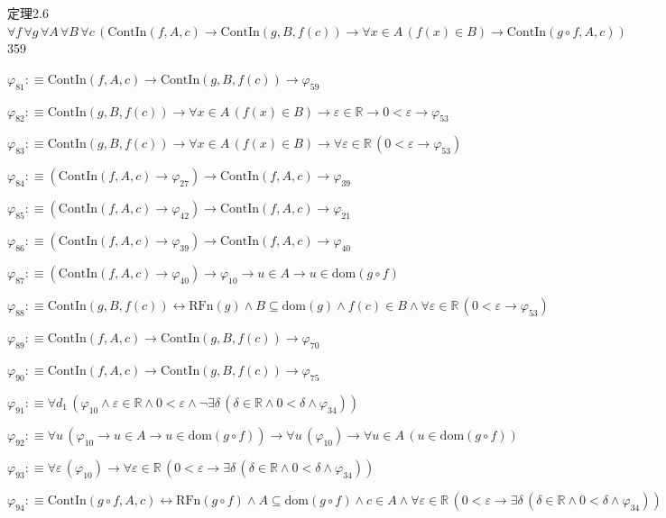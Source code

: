 \begin{fullproof}{定理2.6}{$\forall f\,\forall g\,\forall A\,\forall B\,\forall c\,(\mathrm{ContIn}(f,A,c) \to \mathrm{ContIn}(g,B,f(c)) \to \forall x \in A\,(f(x) \in B) \to \mathrm{ContIn}(g \circ f,A,c))$}{359}
\begin{abbrevlist}
\item $\varphi_{81} :\equiv \mathrm{ContIn}(f,A,c) \to \mathrm{ContIn}(g,B,f(c)) \to \varphi_{59}$
\item $\varphi_{82} :\equiv \mathrm{ContIn}(g,B,f(c)) \to \forall x \in A\,(f(x) \in B) \to \varepsilon \in \mathbb{R} \to 0 < \varepsilon \to \varphi_{53}$
\item $\varphi_{83} :\equiv \mathrm{ContIn}(g,B,f(c)) \to \forall x \in A\,(f(x) \in B) \to \forall \varepsilon \in \mathbb{R}\,(0 < \varepsilon \to \varphi_{53})$
\item $\varphi_{84} :\equiv (\mathrm{ContIn}(f,A,c) \to \varphi_{27}) \to \mathrm{ContIn}(f,A,c) \to \varphi_{39}$
\item $\varphi_{85} :\equiv (\mathrm{ContIn}(f,A,c) \to \varphi_{42}) \to \mathrm{ContIn}(f,A,c) \to \varphi_{21}$
\item $\varphi_{86} :\equiv (\mathrm{ContIn}(f,A,c) \to \varphi_{39}) \to \mathrm{ContIn}(f,A,c) \to \varphi_{40}$
\item $\varphi_{87} :\equiv (\mathrm{ContIn}(f,A,c) \to \varphi_{40}) \to \varphi_{10} \to u \in A \to u \in \mathrm{dom}(g \circ f)$
\item $\varphi_{88} :\equiv \mathrm{ContIn}(g,B,f(c)) \leftrightarrow \mathrm{RFn}(g) \land B \subseteq \mathrm{dom}(g) \land f(c) \in B \land \forall \varepsilon \in \mathbb{R}\,(0 < \varepsilon \to \varphi_{53})$
\item $\varphi_{89} :\equiv \mathrm{ContIn}(f,A,c) \to \mathrm{ContIn}(g,B,f(c)) \to \varphi_{70}$
\item $\varphi_{90} :\equiv \mathrm{ContIn}(f,A,c) \to \mathrm{ContIn}(g,B,f(c)) \to \varphi_{75}$
\item $\varphi_{91} :\equiv \forall d_{1}\,(\varphi_{10} \land \varepsilon \in \mathbb{R} \land 0 < \varepsilon \land \neg \exists \delta\,(\delta \in \mathbb{R} \land 0 < \delta \land \varphi_{34}))$
\item $\varphi_{92} :\equiv \forall u\,(\varphi_{10} \to u \in A \to u \in \mathrm{dom}(g \circ f)) \to \forall u\,(\varphi_{10}) \to \forall u \in A\,(u \in \mathrm{dom}(g \circ f))$
\item $\varphi_{93} :\equiv \forall \varepsilon\,(\varphi_{10}) \to \forall \varepsilon \in \mathbb{R}\,(0 < \varepsilon \to \exists \delta\,(\delta \in \mathbb{R} \land 0 < \delta \land \varphi_{34}))$
\item $\varphi_{94} :\equiv \mathrm{ContIn}(g \circ f,A,c) \leftrightarrow \mathrm{RFn}(g \circ f) \land A \subseteq \mathrm{dom}(g \circ f) \land c \in A \land \forall \varepsilon \in \mathbb{R}\,(0 < \varepsilon \to \exists \delta\,(\delta \in \mathbb{R} \land 0 < \delta \land \varphi_{34}))$

\end{abbrevlist}
\end{fullproof}
